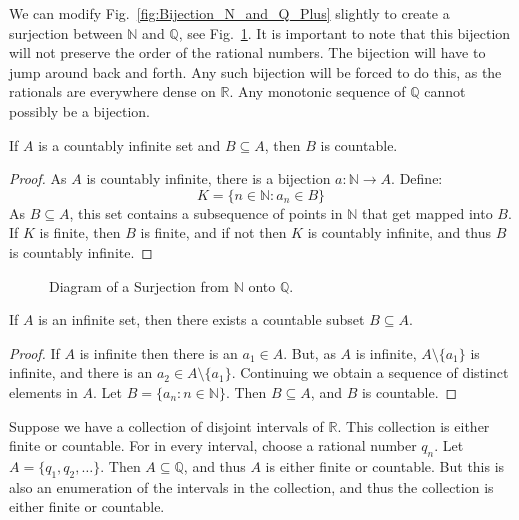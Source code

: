     We can modify Fig.~\ref{fig:Bijection_N_and_Q_Plus}
    slightly to create a surjection between $\mathbb{N}$
    and $\mathbb{Q}$, see
    Fig.~\ref{fig:Bijection_N_and_Q}.
    It is important to note that this bijection will not
    preserve the order of the rational numbers. The
    bijection will have to jump around back and forth.
    Any such bijection will be forced to do this, as the
    rationals are everywhere dense on $\mathbb{R}$. Any
    monotonic sequence of $\mathbb{Q}$ cannot possibly
    be a bijection.
    \begin{theorem}
        If $A$ is a countably infinite set and
        $B\subseteq{A}$, then $B$ is countable.
    \end{theorem}
    \begin{proof}
        As $A$ is countably infinite, there is a bijection
        $a:\mathbb{N}\rightarrow{A}$. Define:
        \begin{equation}
            K=\{n\in\mathbb{N}:a_{n}\in{B}\}
        \end{equation}
        As $B\subseteq{A}$,
        this set contains a subsequence of points in
        $\mathbb{N}$ that get mapped into $B$. If $K$ is finite,
        then $B$ is finite, and if not then $K$ is countably
        infinite, and thus $B$ is countably infinite.
    \end{proof}
    \begin{figure}[H]
        \centering
        \captionsetup{type=figure}
        \resizebox{\textwidth}{!}{%
            
        }
        \caption{Diagram of a Surjection from
                 $\mathbb{N}$ onto $\mathbb{Q}$.}
        \label{fig:Bijection_N_and_Q}
    \end{figure}
    \begin{theorem}
        If $A$ is an infinite set, then there exists a
        countable subset $B\subseteq{A}$.
    \end{theorem}
    \begin{proof}
        If $A$ is infinite then there is an
        $a_{1}\in{A}$. But, as $A$ is infinite,
        $A\setminus\{a_{1}\}$ is infinite, and there
        is an $a_{2}\in{A}\setminus\{a_{1}\}$. Continuing
        we obtain a sequence of distinct elements in $A$.
        Let $B=\{a_{n}:n\in\mathbb{N}\}$. Then
        $B\subseteq{A}$, and $B$ is countable.
    \end{proof}
    \begin{lexample}
        Suppose we have a collection of disjoint intervals
        of $\mathbb{R}$. This collection is either finite
        or countable. For in every interval, choose a
        rational number $q_{n}$. Let
        $A=\{q_{1},q_{2},\hdots\}$. Then
        $A\subseteq\mathbb{Q}$, and thus $A$ is either
        finite or countable. But this is also an enumeration
        of the intervals in the collection, and thus the
        collection is either finite or countable.
    \end{lexample}
